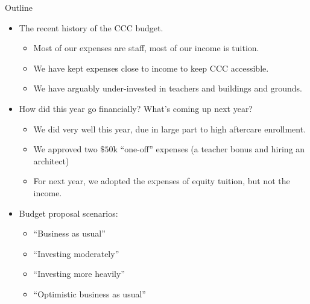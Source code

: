 \documentclass[8pt]{beamer}
\begin{document}
\begin{frame}{Outline}
%
\begin{itemize}
%
\item The recent history of the CCC budget.
\begin{itemize}
    \item Most of our expenses are staff, most of our income is tuition.
    \item We have kept expenses close to income to keep CCC accessible.
    \item We have arguably under-invested in teachers and buildings and grounds.
\end{itemize}
\pause
\item How did this year go financially?  What's coming up next year?
\begin{itemize}
    \item We did very well this year, due in large part to high aftercare enrollment.
    \item We approved two $\$50$k ``one-off'' expenses (a teacher bonus and hiring an architect)
    \item For next year, we adopted the expenses of equity tuition, but not the income.
\end{itemize}
\pause
\item Budget proposal scenarios:
\begin{itemize}
    \item ``Business as usual''
    \item ``Investing moderately''
    \item ``Investing more heavily''
    \item ``Optimistic business as usual''
%
\end{itemize}
\end{itemize}
%
\end{frame}
\end{document}
